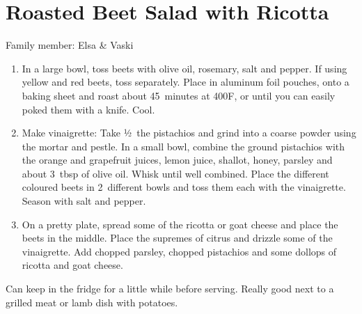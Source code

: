 \chapter{Roasted Beet Salad with Ricotta}
\label{ch:roasted-beet-salad}


Family member: Elsa \& Vaski

\begin{enumerate}
    \item In a large bowl, toss beets with olive oil, rosemary, salt and pepper. If using yellow and red beets, toss separately. Place in aluminum foil pouches, onto a baking sheet and roast about 45~minutes at 400\degree F, or until you can easily poked them with a knife. Cool.
    \item Make vinaigrette: Take ½~the pistachios and grind into a coarse powder using the mortar and pestle. In a small bowl, combine the ground pistachios with the orange and grapefruit juices, lemon juice, shallot, honey, parsley and about 3~tbsp of olive oil. Whisk until well combined. Place the different coloured beets in 2~different bowls and toss them each with the vinaigrette. Season with salt and pepper.
    \item On a pretty plate, spread some of the ricotta or goat cheese and place the beets in the middle. Place the supremes of citrus and drizzle some of the vinaigrette. Add chopped parsley, chopped pistachios and some dollops of ricotta and goat cheese.
\end{enumerate}

Can keep in the fridge for a little while before serving.
Really good next to a grilled meat or lamb dish with potatoes.
